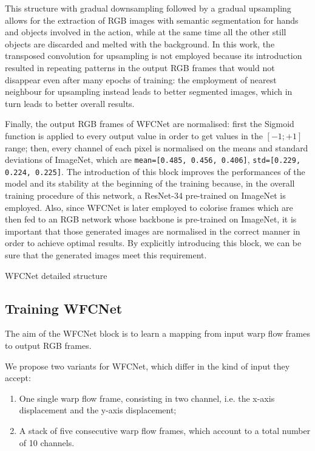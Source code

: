 \documentclass[10pt,twocolumn,letterpaper]{article}
\begin{document}
This structure with gradual downsampling followed by a gradual upsampling allows for the extraction of RGB images with semantic segmentation for hands and objects involved in the action, while at the same time all the other still objects are discarded and melted with the background. In this work, the transposed convolution for upsampling is not employed because its introduction resulted in repeating patterns in the output RGB frames that would not disappear even after many epochs of training: the employment of nearest neighbour for upsampling instead leads to better segmented images, which in turn leads to better overall results.

Finally, the output RGB frames of WFCNet are normalised: first the Sigmoid function is applied to every output value in order to get values in the $[-1; +1]$ range; then, every channel of each pixel is normalised on the means and standard deviations of ImageNet, which are \texttt{mean=[0.485, 0.456, 0.406]}, \texttt{std=[0.229, 0.224, 0.225]}. The introduction of this block improves the performances of the model and its stability at the beginning of the training because, in the overall training procedure of this network, a ResNet-34 pre-trained on ImageNet is employed. Also, since WFCNet is later employed to colorise frames which are then fed to an RGB network whose backbone is pre-trained on ImageNet, it is important that those generated images are normalised in the correct manner in order to achieve optimal results. By explicitly introducing this block, we can be sure that the generated images meet this requirement.

\begin{table}
	
	\vspace{5mm}
	\label{tab:wfcnet}
	\caption{WFCNet detailed structure}
\end{table}

\subsection{Training WFCNet}
\label{par:TrainingWFCNet}

The aim of the WFCNet block is to learn a mapping from input warp flow frames to output RGB frames.

We propose two variants for WFCNet, which differ in the kind of input they accept:
\begin{enumerate}
	\item One single warp flow frame, consisting in two channel, i.e. the x-axis displacement and the y-axis displacement;
	\item A stack of five consecutive warp flow frames, which account to a total number of 10 channels.
\end{enumerate}
\end{document}

